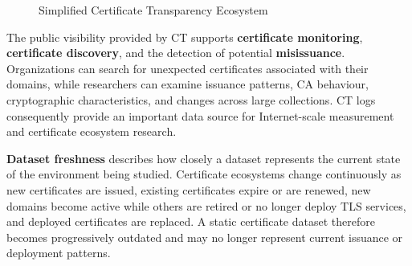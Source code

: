 \begin{figure}[H]
  \centering
  \caption{Simplified Certificate Transparency Ecosystem}
  \label{fig:certificate-transparency-ecosystem}
\end{figure}

The public visibility provided by CT supports \textbf{certificate monitoring},
\textbf{certificate discovery}, and the detection of potential
\textbf{misissuance}. Organizations can search for unexpected certificates
associated with their domains, while researchers can examine issuance
patterns, CA behaviour, cryptographic characteristics, and changes across large
collections. CT logs consequently provide an important data source for
Internet-scale measurement and certificate ecosystem research.

\textbf{Dataset freshness} describes how closely a dataset represents the
current state of the environment being studied. Certificate ecosystems change
continuously as new certificates are issued, existing certificates expire or
are renewed, new domains become active while others are retired or no longer deploy TLS services, and deployed certificates are
replaced. A static certificate dataset therefore becomes progressively
outdated and may no longer represent current issuance or deployment patterns.

